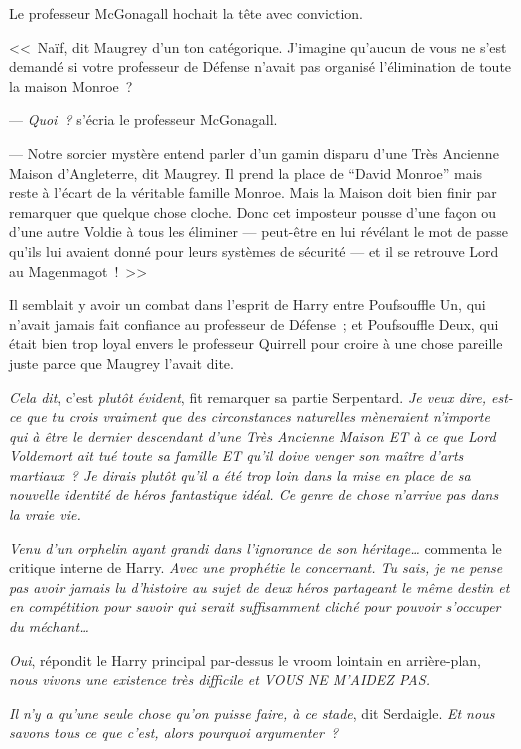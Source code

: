 Le professeur McGonagall hochait la tête avec conviction.

<<~Naïf, dit Maugrey d'un ton catégorique. J'imagine qu'aucun de vous ne s'est demandé si votre professeur de Défense n'avait pas organisé l'élimination de toute la maison Monroe~?

--- \emph{Quoi~?} s'écria le professeur McGonagall.

--- Notre sorcier mystère entend parler d'un gamin disparu d'une Très Ancienne Maison d'Angleterre, dit Maugrey. Il prend la place de “David Monroe” mais reste à l'écart de la véritable famille Monroe. Mais la Maison doit bien finir par remarquer que quelque chose cloche. Donc cet imposteur pousse d'une façon ou d'une autre Voldie à tous les éliminer — peut-être en lui révélant le mot de passe qu'ils lui avaient donné pour leurs systèmes de sécurité — et il se retrouve Lord au Magenmagot~!~>>

Il semblait y avoir un combat dans l'esprit de Harry entre Poufsouffle Un, qui n'avait jamais fait confiance au professeur de Défense~; et Poufsouffle Deux, qui était bien trop loyal envers le professeur Quirrell pour croire à une chose pareille juste parce que Maugrey l'avait dite.

\emph{Cela dit}, c'est \emph{plutôt évident}, fit remarquer sa partie Serpentard. \emph{Je veux dire, est-ce que tu crois vraiment que des circonstances naturelles mèneraient n'importe qui à être le dernier descendant d'une Très Ancienne Maison ET à ce que Lord Voldemort ait tué toute sa famille ET qu'il doive venger son maître d'arts martiaux~? Je dirais plutôt qu'il a été trop loin dans la mise en place de sa nouvelle identité de héros fantastique idéal. Ce genre de chose n'arrive pas dans la vraie vie.}

\emph{Venu d'un orphelin ayant grandi dans l'ignorance de son héritage…} commenta le critique interne de Harry. \emph{Avec une prophétie le concernant. Tu sais, je ne pense pas avoir jamais lu d'histoire au sujet de deux héros partageant le même destin et en compétition pour savoir qui serait suffisamment cliché pour pouvoir s'occuper du méchant…}

\emph{Oui}, répondit le Harry principal par-dessus le vroom lointain en arrière-plan, \emph{nous vivons une existence très difficile et VOUS NE M'AIDEZ PAS.}

\emph{Il n'y a qu'une seule chose qu'on puisse faire, à ce stade}, dit Serdaigle. \emph{Et nous savons tous ce que c'est, alors pourquoi argumenter~?}

